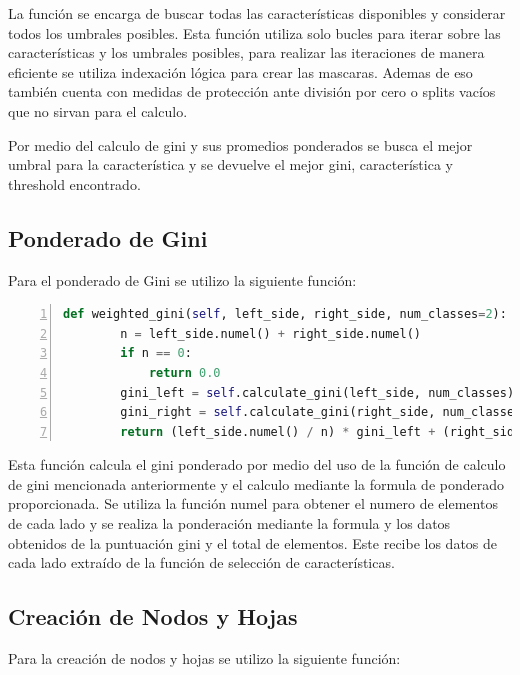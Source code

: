 \documentclass[12pt,a4paper]{article}
\begin{document}
La función se encarga de buscar todas las características disponibles y considerar todos los umbrales posibles.
Esta función utiliza solo bucles para iterar sobre las características y los umbrales posibles,
para realizar las iteraciones de manera eficiente se utiliza indexación lógica para crear las mascaras.
Ademas de eso también cuenta con medidas de protección ante división por cero o splits vacíos que no sirvan para el calculo.

Por medio del calculo de gini y sus promedios ponderados se busca el mejor umbral para la característica y se devuelve el mejor gini, característica y threshold encontrado.

\subsection{Ponderado de Gini}\label{subsec:ponderado-de-gini}

Para el ponderado de Gini se utilizo la siguiente función:

    \begin{lstlisting}[language=Python, numbers=left, basicstyle=\ttfamily\tiny,label={lst:lstlisting4}]
  def weighted_gini(self, left_side, right_side, num_classes=2):
        n = left_side.numel() + right_side.numel()
        if n == 0:
            return 0.0
        gini_left = self.calculate_gini(left_side, num_classes)
        gini_right = self.calculate_gini(right_side, num_classes)
        return (left_side.numel() / n) * gini_left + (right_side.numel() / n) * gini_right
    \end{lstlisting}

Esta función calcula el gini ponderado por medio del uso de la función de calculo de gini mencionada anteriormente y el calculo mediante la formula
de ponderado proporcionada.
Se utiliza la función numel para obtener el numero de elementos de cada lado y se realiza la ponderación mediante la formula y los
datos obtenidos de la puntuación gini y el total de elementos.
Este recibe los datos de cada lado extraído de la función de selección de características.

\subsection{Creación de Nodos y Hojas}\label{subsec:creacion-de-nodos-y-hojas}

Para la creación de nodos y hojas se utilizo la siguiente función:
\end{document}

